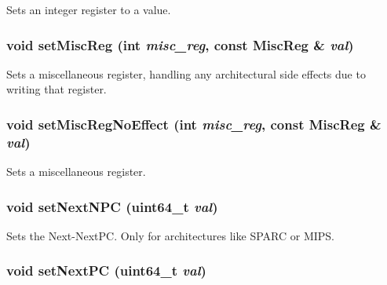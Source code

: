 \label{classExecContext_a654e99f2be7cd298378462ce9651bb44}
Sets an integer register to a value. \hypertarget{classExecContext_a1877dde4f3eb17a8b7d33ea40176c148}{
\subsubsection[{setMiscReg}]{\setlength{\rightskip}{0pt plus 5cm}void setMiscReg (int {\em misc\_\-reg}, \/  const MiscReg \& {\em val})}}
\label{classExecContext_a1877dde4f3eb17a8b7d33ea40176c148}
Sets a miscellaneous register, handling any architectural side effects due to writing that register. \hypertarget{classExecContext_a763517aaea2f3decbc1ef9d064216b6f}{
\subsubsection[{setMiscRegNoEffect}]{\setlength{\rightskip}{0pt plus 5cm}void setMiscRegNoEffect (int {\em misc\_\-reg}, \/  const MiscReg \& {\em val})}}
\label{classExecContext_a763517aaea2f3decbc1ef9d064216b6f}
Sets a miscellaneous register. \hypertarget{classExecContext_ad9318b66094af0afc4246ccce9fafe0b}{
\subsubsection[{setNextNPC}]{\setlength{\rightskip}{0pt plus 5cm}void setNextNPC (uint64\_\-t {\em val})}}
\label{classExecContext_ad9318b66094af0afc4246ccce9fafe0b}
Sets the Next-\/NextPC. Only for architectures like SPARC or MIPS. \hypertarget{classExecContext_ac01bbbec5b2a7338e18d05322ba78cd3}{
\subsubsection[{setNextPC}]{\setlength{\rightskip}{0pt plus 5cm}void setNextPC (uint64\_\-t {\em val})}}
